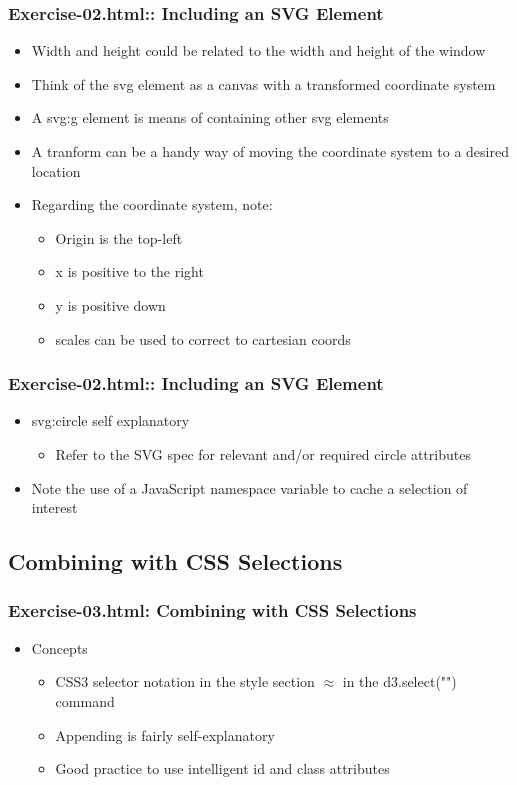 \documentclass{beamer}
\begin{document}
\begin{frame}
    \frametitle{Exercise-02.html:: Including an SVG Element}
    \begin{itemize}
    \item Width and height could be related to the width and height of the window
    \item Think of the svg element as a canvas with a transformed coordinate system
    \item A svg:g element is means of containing other svg elements
    \item A tranform can be a handy way of moving the coordinate system to a desired location
    \item Regarding the coordinate system, note:
        \begin{itemize}
        \item Origin is the top-left
        \item x is positive to the right
        \item y is positive down
        \item scales can be used to correct to cartesian coords
        \end{itemize}
    \end{itemize}
\end{frame}


\begin{frame}
    \frametitle{Exercise-02.html:: Including an SVG Element}
    \begin{itemize}
    \item svg:circle self explanatory
        \begin{itemize}
        \item Refer to the SVG spec for relevant and/or required circle attributes
        \end{itemize}
    \item Note the use of a JavaScript namespace variable to cache a selection of interest
    \end{itemize}
\end{frame}



\subsection{Combining with CSS Selections}

\begin{frame}
    \frametitle{Exercise-03.html: Combining with CSS Selections}
        \begin{itemize}
        \item Concepts
            \begin{itemize}
            \item CSS3 selector notation in the style section $\approx$ in the d3.select("") command
            \item Appending is fairly self-explanatory
            \item Good practice to use intelligent id and class attributes
            \end{itemize}
        \end{itemize}
\end{frame}
\end{document}
